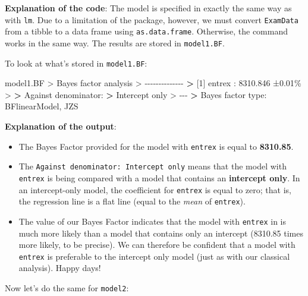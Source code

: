 \documentclass[
]{book}
\newenvironment{Shaded}{\begin{snugshade}}{\end{snugshade}}
\newcommand{\DecValTok}[1]{\textcolor[rgb]{0.00,0.00,0.81}{#1}}
\newcommand{\ErrorTok}[1]{\textcolor[rgb]{0.64,0.00,0.00}{\textbf{#1}}}
\newcommand{\FloatTok}[1]{\textcolor[rgb]{0.00,0.00,0.81}{#1}}
\newcommand{\NormalTok}[1]{#1}
\newcommand{\SpecialCharTok}[1]{\textcolor[rgb]{0.00,0.00,0.00}{#1}}
\theoremstyle{definition}
\theoremstyle{definition}
\theoremstyle{definition}
\theoremstyle{definition}
\theoremstyle{remark}
\begin{document}
\textbf{Explanation of the code}: The model is specified in exactly the same way as with \texttt{lm}. Due to a limitation of the package, however, we must convert \texttt{ExamData} from a tibble to a data frame using \texttt{as.data.frame}. Otherwise, the command works in the same way. The results are stored in \texttt{model1.BF}.

\hfill\break
To look at what's stored in \texttt{model1.BF}:

\begin{Shaded}
\begin{Highlighting}[]
\NormalTok{model1.BF}
\SpecialCharTok{\textgreater{}}\NormalTok{ Bayes factor analysis}
\SpecialCharTok{\textgreater{}} \SpecialCharTok{{-}{-}{-}{-}{-}{-}{-}{-}{-}{-}{-}{-}{-}{-}}
\ErrorTok{\textgreater{}}\NormalTok{ [}\DecValTok{1}\NormalTok{] entrex }\SpecialCharTok{:} \FloatTok{8310.846}\NormalTok{ ±}\FloatTok{0.01}\NormalTok{\%}
\SpecialCharTok{\textgreater{}} 
\ErrorTok{\textgreater{}}\NormalTok{ Against denominator}\SpecialCharTok{:}
\ErrorTok{\textgreater{}}\NormalTok{   Intercept only }
\SpecialCharTok{\textgreater{}} \SpecialCharTok{{-}{-}{-}}
\ErrorTok{\textgreater{}}\NormalTok{ Bayes factor type}\SpecialCharTok{:}\NormalTok{ BFlinearModel, JZS}
\end{Highlighting}
\end{Shaded}

\textbf{Explanation of the output}:

\begin{itemize}
\item
  The Bayes Factor provided for the model with \texttt{entrex} is equal to \textbf{8310.85}.
\item
  The \texttt{Against\ denominator:\ Intercept\ only} means that the model with \texttt{entrex} is being compared with a model that contains an \textbf{intercept only}. In an intercept-only model, the coefficient for \texttt{entrex} is equal to zero; that is, the regression line is a flat line (equal to the \emph{mean} of \texttt{entrex}).
\item
  The value of our Bayes Factor indicates that the model with \texttt{entrex} in is much more likely than a model that contains only an intercept (8310.85 times more likely, to be precise). We can therefore be confident that a model with \texttt{entrex} is preferable to the intercept only model (just as with our classical analysis). Happy days!
\end{itemize}

\hfill\break
Now let's do the same for \texttt{model2}:
\end{document}
